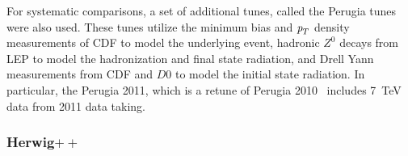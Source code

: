 For systematic comparisons, a set of additional tunes, called the Perugia tunes~\cite{Perugia} were also used. These tunes utilize the minimum bias and ${\emph{p}_{T}}$ density measurements of CDF to model the underlying event, hadronic $Z^0$ decays from LEP to model the hadronization and final state radiation, and Drell Yann measurements from CDF and $D0$ to model the initial state radiation.  In particular, the Perugia 2011, which is a retune of Perugia 2010~\cite{Perugia2010} includes 7~TeV data from 2011 data taking.



\subsubsection{Herwig$++$}

